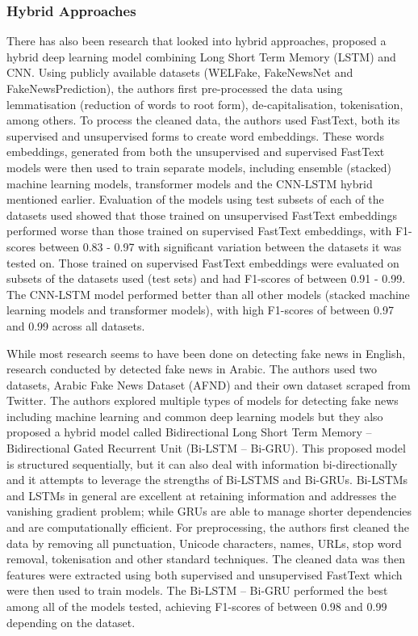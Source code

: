 \documentclass[stu,12pt,floatsintext,donotrepeattitle]{apa7}
\begin{document}
\subsubsection{Hybrid Approaches}
There has also been research that looked into hybrid approaches, \textcite{hybrid_cnn-lstm} proposed a hybrid deep learning model combining Long Short Term Memory (LSTM) and CNN. Using publicly available datasets (WELFake, FakeNewsNet and FakeNewsPrediction), the authors first pre-processed the data using lemmatisation (reduction of words to root form), de-capitalisation, tokenisation, among others. To process the cleaned data, the authors used FastText, both its supervised and unsupervised forms to create word embeddings. These words embeddings, generated from both the unsupervised and supervised FastText models were then used to train separate models, including ensemble (stacked) machine learning models, transformer models and the CNN-LSTM hybrid mentioned earlier. Evaluation of the models using test subsets of each of the datasets used showed that those trained on unsupervised FastText embeddings performed worse than those trained on supervised FastText embeddings, with F1-scores between 0.83 - 0.97 with significant variation between the datasets it was tested on. Those trained on supervised FastText embeddings were evaluated on subsets of the datasets used (test sets) and had F1-scores of between 0.91 - 0.99. The CNN-LSTM model performed better than all other models (stacked machine learning models and transformer models), with high F1-scores of between 0.97 and 0.99 across all datasets.

While most research seems to have been done on detecting fake news in English, research conducted by \textcite{hybrid2} detected fake news in Arabic. The authors used two datasets, Arabic Fake News Dataset (AFND) and their own dataset scraped from Twitter. The authors explored multiple types of models for detecting fake news including machine learning and common deep learning models but they also proposed a hybrid model called Bidirectional Long Short Term Memory – Bidirectional Gated Recurrent Unit (Bi-LSTM – Bi-GRU). This proposed model is structured sequentially, but it can also deal with information bi-directionally and it attempts to leverage the strengths of Bi-LSTMS and Bi-GRUs. Bi-LSTMs and LSTMs in general are excellent at retaining information and addresses the vanishing gradient problem; while GRUs are able to manage shorter dependencies and are computationally efficient. For preprocessing, the authors first cleaned the data by removing all punctuation, Unicode characters, names, URLs, stop word removal, tokenisation and other standard techniques. The cleaned data was then features were extracted using both supervised and unsupervised FastText which were then used to train models. The Bi-LSTM – Bi-GRU performed the best among all of the models tested, achieving F1-scores of between 0.98 and 0.99 depending on the dataset. 
\end{document}
